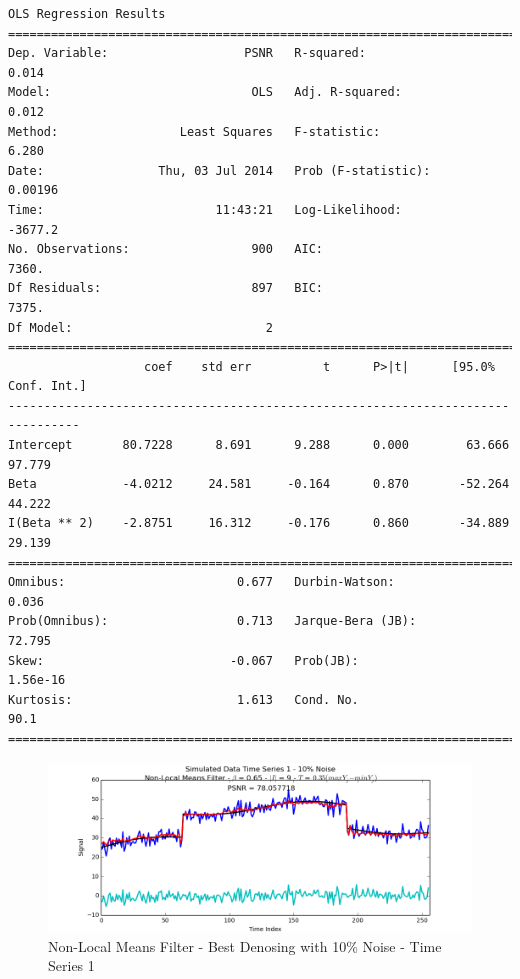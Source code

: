\documentclass[11pt]{article}
\theoremstyle{definition}
\begin{document}
{\begin{lstlisting}[caption = Time Series 3 - Non-Local Means OLS Model - $\beta$ Only, label = {nlmeansbeta3}]
                            OLS Regression Results                            
==============================================================================
Dep. Variable:                   PSNR   R-squared:                       0.014
Model:                            OLS   Adj. R-squared:                  0.012
Method:                 Least Squares   F-statistic:                     6.280
Date:                Thu, 03 Jul 2014   Prob (F-statistic):            0.00196
Time:                        11:43:21   Log-Likelihood:                -3677.2
No. Observations:                 900   AIC:                             7360.
Df Residuals:                     897   BIC:                             7375.
Df Model:                           2                                         
================================================================================
                   coef    std err          t      P>|t|      [95.0% Conf. Int.]
--------------------------------------------------------------------------------
Intercept       80.7228      8.691      9.288      0.000        63.666    97.779
Beta            -4.0212     24.581     -0.164      0.870       -52.264    44.222
I(Beta ** 2)    -2.8751     16.312     -0.176      0.860       -34.889    29.139
==============================================================================
Omnibus:                        0.677   Durbin-Watson:                   0.036
Prob(Omnibus):                  0.713   Jarque-Bera (JB):               72.795
Skew:                          -0.067   Prob(JB):                     1.56e-16
Kurtosis:                       1.613   Cond. No.                         90.1
==============================================================================
\end{lstlisting}
}

\begin{figure}
\centering
\includegraphics[width = 0.75 \textwidth]{NLMeansSignal1Best.png}
\caption{Non-Local Means Filter - Best Denosing with 10\% Noise - Time Series 1}
\label{nlmeans1best}
\end{figure}
\end{document}
